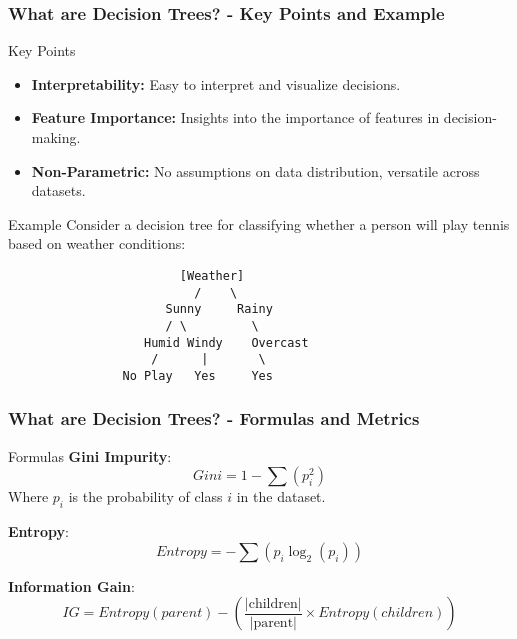 \documentclass[aspectratio=169]{beamer}
\begin{document}
\begin{frame}[fragile]
    \frametitle{What are Decision Trees? - Key Points and Example}
    \begin{block}{Key Points}
        \begin{itemize}
            \item \textbf{Interpretability:} Easy to interpret and visualize decisions.
            \item \textbf{Feature Importance:} Insights into the importance of features in decision-making.
            \item \textbf{Non-Parametric:} No assumptions on data distribution, versatile across datasets.
        \end{itemize}
    \end{block}
    
    \begin{block}{Example}
        Consider a decision tree for classifying whether a person will play tennis based on weather conditions:
        \begin{verbatim}
                        [Weather]
                          /    \
                      Sunny     Rainy
                      / \         \
                   Humid Windy    Overcast
                    /      |       \
                No Play   Yes     Yes
        \end{verbatim}
    \end{block}
\end{frame}

\begin{frame}[fragile]
    \frametitle{What are Decision Trees? - Formulas and Metrics}
    \begin{block}{Formulas}
        \textbf{Gini Impurity}:
        \begin{equation}
            Gini = 1 - \sum (p_i^2)
        \end{equation}
        Where \( p_i \) is the probability of class \( i \) in the dataset.

        \textbf{Entropy}:
        \begin{equation}
            Entropy = -\sum (p_i \log_2(p_i))
        \end{equation}

        \textbf{Information Gain}:
        \begin{equation}
            IG = Entropy(parent) - \left(\frac{|\text{children}|}{|\text{parent}|} \times Entropy(children)\right)
        \end{equation}
    \end{block}
\end{frame}
\end{document}
